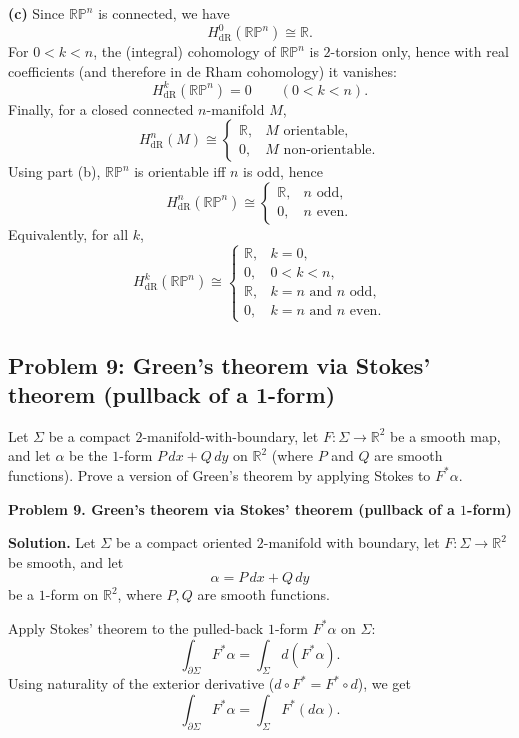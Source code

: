\documentclass[12pt,a4paper]{article}
\theoremstyle{plain}
\theoremstyle{definition}      %
\begin{document}
	\textbf{(c)} Since $\mathbb{RP}^n$ is connected, we have
	\[
	H^0_{\mathrm{dR}}(\mathbb{RP}^n)\cong \mathbb{R}.
	\]
	For $0<k<n$, the (integral) cohomology of $\mathbb{RP}^n$ is $2$-torsion only, hence with real coefficients (and therefore in de Rham cohomology) it vanishes:
	\[
	H^k_{\mathrm{dR}}(\mathbb{RP}^n)=0 \qquad (0<k<n).
	\]
	Finally, for a closed connected $n$-manifold $M$,
	\[
	H^n_{\mathrm{dR}}(M)\cong
	\begin{cases}
		\mathbb{R}, & M \text{ orientable},\\
		0, & M \text{ non-orientable}.
	\end{cases}
	\]
	Using part (b), $\mathbb{RP}^n$ is orientable iff $n$ is odd, hence
	\[
	H^n_{\mathrm{dR}}(\mathbb{RP}^n)\cong
	\begin{cases}
		\mathbb{R}, & n \text{ odd},\\
		0, & n \text{ even}.
	\end{cases}
	\]
	Equivalently, for all $k$,
	\[
	H^k_{\mathrm{dR}}(\mathbb{RP}^n)\cong
	\begin{cases}
		\mathbb{R}, & k=0,\\
		0, & 0<k<n,\\
		\mathbb{R}, & k=n \text{ and } n \text{ odd},\\
		0, & k=n \text{ and } n \text{ even}.
	\end{cases}
	\]
	
	
	\subsection*{Problem 9: Green's theorem via Stokes' theorem (pullback of a 1-form)}
	Let $\Sigma$ be a compact $2$-manifold-with-boundary, let $F : \Sigma \to \mathbb{R}^2$ be a smooth map,
	and let $\alpha$ be the $1$-form $P\,dx + Q\,dy$ on $\mathbb{R}^2$ (where $P$ and $Q$ are smooth functions).
	Prove a version of Green's theorem by applying Stokes to $F^{*}\alpha$.
	
	
	\bigskip
	\textbf{Problem 9. Green's theorem via Stokes' theorem (pullback of a $1$-form)}
	
	\textbf{Solution.}
	Let $\Sigma$ be a compact oriented $2$-manifold with boundary, let $F:\Sigma\to\mathbb{R}^2$ be smooth, and let
	\[
	\alpha = P\,dx + Q\,dy
	\]
	be a $1$-form on $\mathbb{R}^2$, where $P,Q$ are smooth functions.
	
	Apply Stokes' theorem to the pulled-back $1$-form $F^*\alpha$ on $\Sigma$:
	\[
	\int_{\partial\Sigma} F^*\alpha
	=
	\int_{\Sigma} d(F^*\alpha).
	\]
	Using naturality of the exterior derivative ($d\circ F^* = F^*\circ d$), we get
	\[
	\int_{\partial\Sigma} F^*\alpha
	=
	\int_{\Sigma} F^*(d\alpha).
	\]
	
\end{document}
